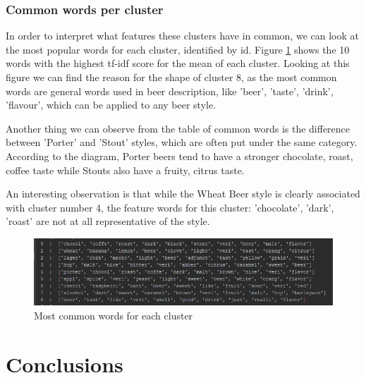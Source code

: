 \documentclass[12pt]{article}
\begin{document}
	\subsubsection{Common words per cluster}
	In order to interpret what features these clusters have in common, we can look at the most popular words for each cluster, identified by id. Figure \ref{fig:words} shows the 10 words with the highest tf-idf score for the mean of each cluster. Looking at this figure we can find the reason for the shape of cluster 8, as the most common words are general words used in beer description, like 'beer', 'taste', 'drink', 'flavour', which can be applied to any beer style. 
	
	Another thing we can observe from the table of common words is the difference between 'Porter' and 'Stout' styles, which are often put under the same category. According to the diagram, Porter beers tend to have a stronger chocolate, roast, coffee taste while Stouts also have a fruity, citrus taste.
	
	An interesting observation is that while the Wheat Beer style is clearly associated with cluster number 4, the feature words for this cluster: 'chocolate', 'dark', 'roast' are not at all representative of the style.
	
	\begin{figure}
		\includegraphics[width=\linewidth]{resources/words.png}
		\caption{Most common words for each cluster}
		\label{fig:words}
	\end{figure}
	
	\section{Conclusions}
	
	\newpage
	
	
\end{document}
